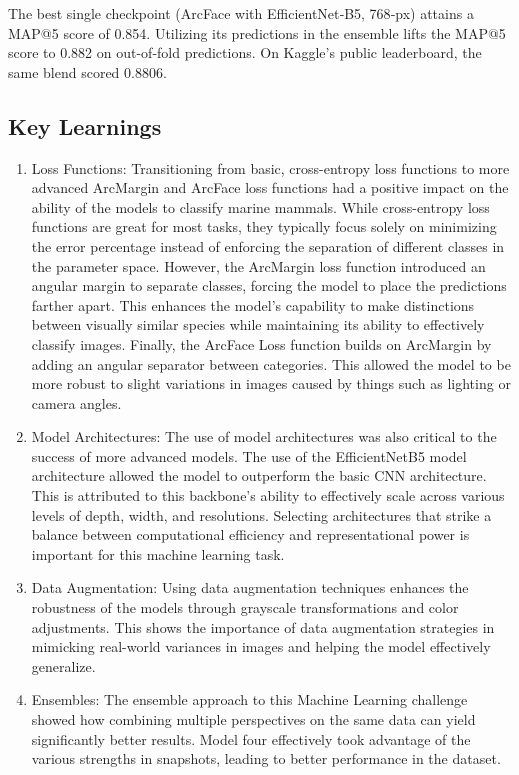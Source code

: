 \documentclass[twocolumn]{article}
\begin{document}
The best single checkpoint (ArcFace with EfficientNet‑B5, 768‑px) attains a MAP@5 score of 0.854. Utilizing its predictions in the ensemble lifts the MAP@5 score to 0.882 on  out-of-fold predictions. On Kaggle's public leaderboard, the same blend scored 0.8806.

\subsection{Key Learnings}

\begin{enumerate}
    \item Loss Functions: Transitioning from basic, cross-entropy loss functions to more advanced ArcMargin and ArcFace loss functions had a positive impact on the ability of the models to classify marine mammals. While cross-entropy loss functions are great for most tasks, they typically focus solely on minimizing the error percentage instead of enforcing the separation of different classes in the parameter space. However, the ArcMargin loss function introduced an angular margin to separate classes, forcing the model to place the predictions farther apart. This enhances the model's capability to make distinctions between visually similar species while maintaining its ability to effectively classify images. Finally, the ArcFace Loss function builds on ArcMargin by adding an angular separator between categories. This allowed the model to be more robust to slight variations in images caused by things such as lighting or camera angles. 
    \item Model Architectures: The use of model architectures was also critical to the success of more advanced models. The use of the EfficientNetB5 model architecture allowed the model to outperform the basic CNN architecture. This is attributed to this backbone's ability to effectively scale across various levels of depth, width, and resolutions. Selecting architectures that strike a balance between computational efficiency and representational power is important for this machine learning task.
    \item Data Augmentation: Using data augmentation techniques enhances the robustness of the models through grayscale transformations and color adjustments. This shows the importance of data augmentation strategies in mimicking real-world variances in images and helping the model effectively generalize. 
    \item Ensembles: The ensemble approach to this Machine Learning challenge showed how combining multiple perspectives on the same data can yield significantly better results. Model four effectively took advantage of the various strengths in snapshots, leading to better performance in the dataset.

\end{enumerate}
\end{document}
